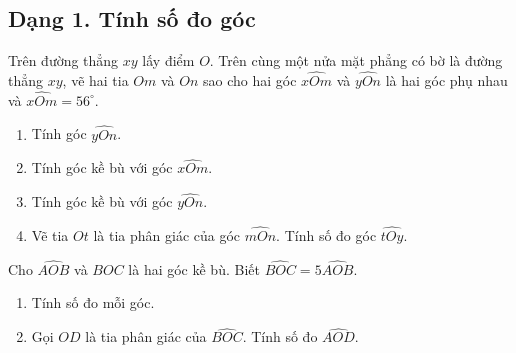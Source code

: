\subsection{Dạng 1. Tính số đo góc}
\noindent

\begin{bt}
	Trên đường thẳng $xy$ lấy điểm $O$.
	Trên cùng một nửa mặt phẳng có bờ là đường thẳng $xy$, vẽ hai tia $Om$ và $On$ sao cho
	hai góc $\widehat{xOm}$ và $\widehat{yOn}$ là hai góc phụ nhau và
	$\widehat{xOm}=56^\circ$.
	
	\begin{enumerate}[label=\alph*)]
		\item Tính góc $\widehat{yOn}$.
		
		\item Tính góc kề bù với góc $\widehat{xOm}$.
		
		\item Tính góc kề bù với góc $\widehat{yOn}$.
		
		\item Vẽ tia $Ot$ là tia phân giác của góc $\widehat{mOn}$.
		Tính số đo góc $\widehat{tOy}$.
	\end{enumerate}
\end{bt}

\begin{bt}
	Cho $\widehat{AOB}$ và $\widehat{BOC}$ là hai góc kề bù. Biết
	$\widehat{BOC}=5\widehat{AOB}$.
	
	\begin{enumerate}[label=\alph*)]
		\item Tính số đo mỗi góc.
		\item Gọi $OD$ là tia phân giác của $\widehat{BOC}$. Tính số đo $\widehat{AOD}$.
	\end{enumerate}
\end{bt}


